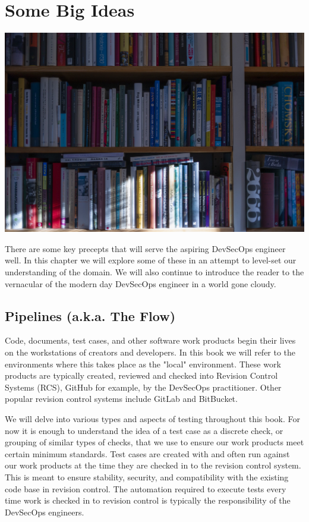 \chapter{Some Big Ideas}
\includegraphics{../images/book-5104342_1920.jpg}

\justify
There are some key precepts that will serve the aspiring DevSecOps
engineer well. In this chapter we will explore some of these in
an attempt to level-set our understanding of the domain. We will also
continue to introduce the reader to the vernacular
of the modern day DevSecOps engineer in a world gone cloudy.

\section{Pipelines (a.k.a. The Flow)}

\justify
Code, documents, test cases, and other software work products begin
their lives on the workstations of creators and developers. In this
book we will refer to the environments where this takes place as the
"local" environment. These work products are typically created, reviewed and
checked into Revision Control Systems (RCS),
GitHub for example, by the DevSecOps practitioner.
Other popular revision control systems include GitLab and
BitBucket.

\justify
We will delve into various types and aspects of testing
throughout this book. For now it is enough to understand the idea of
a test case as a discrete check, or grouping of similar types of
checks, that we use to ensure our work products meet certain minimum
standards.  Test cases are created with and often run against our
work products at the time they are checked in to the revision control
system. This is meant to ensure stability, security, and compatibility
with the existing code base in revision control. The automation required
to execute tests every time work is checked in to revision control is
typically the responsibility of the DevSecOps engineers.

